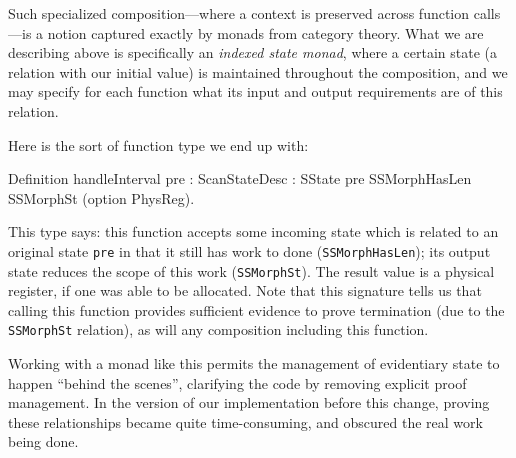 \documentclass{llncs}
\newenvironment{MyCoqExampleStar}{\small \verbatim}{\endverbatim \normalsize}
\begin{document}
Such specialized composition---where a context is preserved across function
calls---is a notion captured exactly by monads from category theory.  What we
are describing above is specifically an \emph{indexed state monad}, where a
certain state (a relation with our initial value) is maintained throughout the
composition, and we may specify for each function what its input and output
requirements are of this relation.

Here is the sort of function type we end up with:

\begin{MyCoqExampleStar}
Definition handleInterval {pre : ScanStateDesc}
  : SState pre SSMorphHasLen SSMorphSt (option PhysReg).
\end{MyCoqExampleStar}






This type says: this function accepts some incoming state which is related to
an original state \texttt{pre} in that it still has work to done
(\texttt{SSMorphHasLen}); its output state reduces the scope of this work
(\texttt{SSMorphSt}).  The result value is a physical register, if one was
able to be allocated.  Note that this signature tells us that calling this
function provides sufficient evidence to prove termination (due to the
\texttt{SSMorphSt} relation), as will any composition including this function.

Working with a monad like this permits the management of evidentiary state to
happen ``behind the scenes'', clarifying the code by removing explicit proof
management.  In the version of our implementation before this change, proving
these relationships became quite time-consuming, and obscured the real work
being done.
\end{document}
